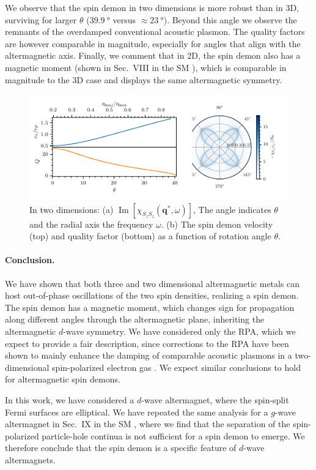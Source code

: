 \documentclass[aps,prl,reprint,twocolumns,superscriptaddress]{revtex4-2}
\DeclareMathOperator{\Imm}{Im}
\newcommand{\criticalangle}{\SI{39.9}{\degree}}
\begin{document}
	
	We observe that the spin demon in two dimensions is more robust than in 3D, surviving for larger $\theta$ ($\criticalangle$ versus $\approx\SI{23}{\degree}$). Beyond this angle we observe the remnants of the overdamped conventional acoustic plasmon. The quality factors are however comparable in magnitude, especially for angles that align with the altermagnetic axis. Finally, we comment that in 2D, the spin demon also has a magnetic moment (shown in Sec.~VIII in the SM \cite{Note1}), which is comparable in magnitude to the 3D case and displays the same altermagnetic symmetry.
	
	\begin{figure}
		\includegraphics{2D}
		\caption{In two dimensions: (a) $\Imm[\chi_{S_zS_z}(\bm q^*,\omega)]$, The angle indicates $\theta$ and the radial axis the frequency $\omega$. (b) The spin demon velocity (top) and quality factor (bottom) as a function of rotation angle  $\theta$. \label{fig:2D} }
	\end{figure}
	

	
	
	\paragraph{Conclusion. }We have shown that both three and two dimensional altermagnetic metals can host out-of-phase oscillations of the two spin densities, realizing a spin demon. 
	The spin demon has a magnetic moment, which changes sign for propagation along different angles through the altermagnetic plane, inheriting the altermagnetic $d$-wave symmetry.
	We have considered only the RPA, which we expect to provide a fair description, since corrections to the RPA have been shown to mainly enhance the damping of comparable acoustic plasmons in a two-dimensional spin-polarized electron gas \cite{kreilExcitationsSpinpolarizedTwodimensional2015}. We expect similar conclusions to hold for altermagnetic spin demons.
	
	
	In this work, we have considered a $d$-wave altermagnet, where the spin-split Fermi surfaces are elliptical. We have repeated the same analysis for a $g$-wave altermagnet in Sec.~IX in the SM \cite{Note1}, where we find that the separation of the spin-polarized particle-hole continua is not sufficient for a spin demon to emerge. We therefore conclude that the spin demon is a specific feature of $d$-wave altermagnets.
	
\end{document}
